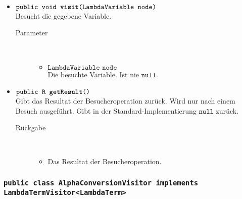 \begin{description}
\begin{itemize}
		\item $\texttt{public void \textbf{visit}(LambdaVariable node)}$ \\ Besucht die gegebene Variable.
		\begin{description}
			\item[Parameter] \hfill \\
			\vspace{-.8cm}
			\begin{itemize}
				\item $\texttt{LambdaVariable node}$ \\ Die besuchte Variable. Ist nie $\texttt{null}$.
			\end{itemize}
		\end{description}
		
		\item $\texttt{public R \textbf{getResult}()}$ \\ Gibt das Resultat der Besucheroperation zurück. Wird nur nach einem Besuch ausgeführt. Gibt in der Standard-Implementierung $\texttt{null}$ zurück.
		\begin{description}
			\item[Rückgabe] \hfill \\
			\vspace{-.8cm}
			\begin{itemize}
				\item Das Resultat der Besucheroperation.
			\end{itemize}
		\end{description}
	\end{itemize}
\end{description}

\subsubsection{\normalfont \texttt{public class \textbf{AlphaConversionVisitor} implements LambdaTermVisitor<LambdaTerm>}}

